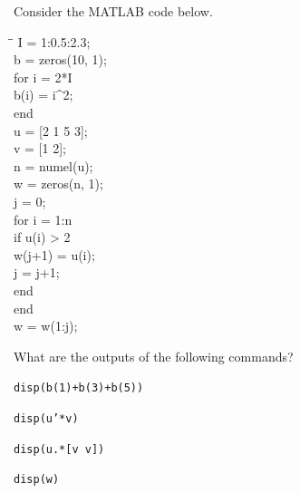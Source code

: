 \begin{problem}
Consider the MATLAB code below.

{\small\ttfamily
\begin{tabbing}
\hspace{2em}\=\hspace{2em}\=\kill
I = 1:0.5:2.3;\\
b = zeros(10, 1);\\
for i = 2*I\\
\>b(i) = i\textasciicircum 2;\\
end\\[0.15em]
u = [2 1 5 3];\\
v = [1 2];\\[0.15em]
n = numel(u);\\
w = zeros(n, 1);\\
j = 0;\\
for i = 1:n\\
\>if u(i) > 2\\
\>\>w(j+1) = u(i);\\
\>\>j = j+1;\\
\>end\\
end\\
w = w(1:j);
\end{tabbing}
}

What are the outputs of the following commands?
\begin{problemsubparts}
\item \texttt{disp(b(1)+b(3)+b(5))}
\item \texttt{disp(u'*v)}
\item \texttt{disp(u.*[v v])}
\item \texttt{disp(w)}
\end{problemsubparts}
\end{problem}

